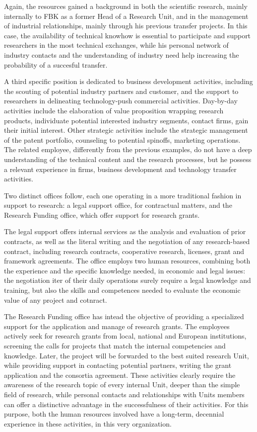 Again, the resources gained a background in both the scientific research, mainly internally to FBK as a former Head of a Research Unit, and in the management of industrial relationships, mainly through his previous transfer projects. In this case, the availability of technical knowhow is essential to participate and support researchers in the most technical exchanges, while his personal network of industry contacts and the understanding of industry need help increasing the probability of a succesful transfer.

A third specific position is dedicated to business development activities, including the scouting of potential industry partners and customer, and the support to researchers in delineating technology-push commercial activities. Day-by-day activities include the elaboration of value proposition wrapping research products, individuate potential interested industry segments, contact firms, gain their initial interest. Other strategic activities include the strategic management of the patent portfolio, counseling to potential spinoffs, marketing operations. The related employee, differently from the previous examples, do not have a deep understanding of the technical content and the research processes, but he possess a relevant experience in firms, business development and technology transfer activities.

Two distinct offices follow, each one operating in a more traditional fashion in support to research: a legal support office, for contractual matters, and the Research Funding office, which offer support for research grants.

The legal support offers internal services as the analysis and evaluation of prior contracts, as well as the literal writing and the negotiation of any research-based contract, including research contracts, cooperative research, licenses, grant and framework agreements. The office employs two human resources, combining both the experience and the specific knowledge needed, in economic and legal issues: the negotiation iter of their daily operations surely require a legal knowledge and training, but also the skills and competences needed to evaluate the economic value of any project and cotnract. 

The Research Funding office has intead the objective of providing a specialized support for the application and manage of research grants. The employees actively seek for research grants from local, national and European institutions, screening the calls for projects that match the internal competencies and knowledge. Later, the project will be forwarded to the best suited research Unit, while providing support in contacting potential partners, writing the grant application and the consortia agreement. These activities clearly require the awareness of the research topic of every internal Unit, deeper than the simple field of research, while personal contacts and relationships with Units members can offer a distinctive advantage in the successfulness of their activities. For this purpose, both the human resources involved have a long-term, decennial experience in these activities, in this very organization.

